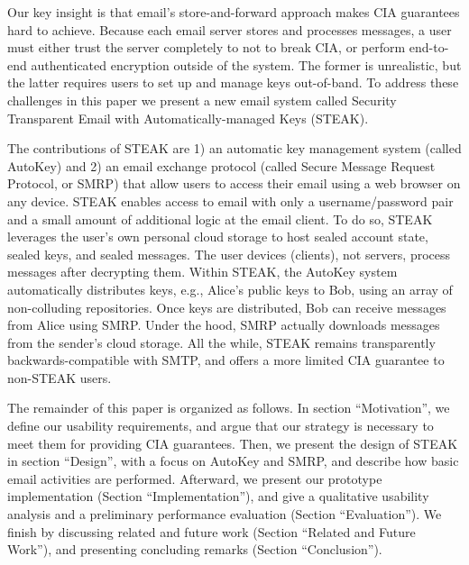 Our key insight is that email’s store-and-forward approach makes CIA 
guarantees hard to achieve. Because each email server stores and processes 
messages, a user must either trust the server completely to not to break 
CIA, or perform end-to-end authenticated encryption outside of the system. 
The former is unrealistic, but the latter requires users to set up and 
manage keys out-of-band. To address these challenges in this paper we 
present a new email system called Security Transparent Email with 
Automatically-managed Keys (STEAK). 

The contributions of STEAK are 1) an automatic key management system 
(called AutoKey) and 2) an email exchange protocol (called Secure Message 
Request Protocol, or SMRP) that allow users to access their email using a 
web browser on any device. STEAK enables access to email with only a 
username/password pair and a small amount of additional logic at the 
email client. To do so, STEAK leverages the user’s own personal cloud 
storage to host sealed account state, sealed keys, and sealed messages. 
The user devices (clients), not servers, process messages after decrypting 
them. Within STEAK, the AutoKey system automatically distributes keys, 
e.g., Alice’s public keys to Bob, using an array of non-colluding 
repositories. Once keys are distributed, Bob can receive 
messages from Alice using SMRP. Under the hood, SMRP 
actually downloads messages from the sender’s cloud storage. All the while, 
STEAK remains transparently backwards-compatible with SMTP, and offers 
a more limited CIA guarantee to non-STEAK users.

The remainder of this paper is organized as follows.  In section “Motivation”, 
we define our usability requirements, and argue that our strategy is necessary 
to meet them for providing CIA guarantees. Then, we present the design of STEAK 
in section “Design”, with a focus on AutoKey and SMRP, and describe how basic 
email activities are performed.  Afterward, we present our prototype 
implementation (Section “Implementation”), and give a qualitative usability 
analysis and a preliminary performance evaluation (Section “Evaluation”).  
We finish by discussing related and future work (Section “Related and Future 
Work”), and presenting concluding remarks (Section “Conclusion”).

